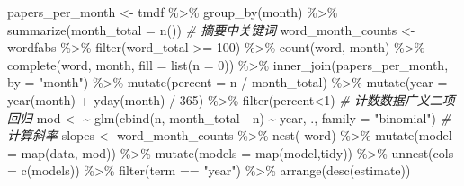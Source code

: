 \documentclass[]{tufte-book}
\newenvironment{Shaded}{}{}
\newcommand{\AttributeTok}[1]{\textcolor[rgb]{0.49,0.56,0.16}{#1}}
\newcommand{\CommentTok}[1]{\textcolor[rgb]{0.38,0.63,0.69}{\textit{#1}}}
\newcommand{\DecValTok}[1]{\textcolor[rgb]{0.25,0.63,0.44}{#1}}
\newcommand{\ErrorTok}[1]{\textcolor[rgb]{1.00,0.00,0.00}{\textbf{#1}}}
\newcommand{\FunctionTok}[1]{\textcolor[rgb]{0.02,0.16,0.49}{#1}}
\newcommand{\NormalTok}[1]{#1}
\newcommand{\OtherTok}[1]{\textcolor[rgb]{0.00,0.44,0.13}{#1}}
\newcommand{\SpecialCharTok}[1]{\textcolor[rgb]{0.25,0.44,0.63}{#1}}
\newcommand{\StringTok}[1]{\textcolor[rgb]{0.25,0.44,0.63}{#1}}
\begin{document}
\begin{Shaded}
\begin{Highlighting}[]
\NormalTok{papers\_per\_month }\OtherTok{\textless{}{-}}\NormalTok{ tmdf }\SpecialCharTok{\%\textgreater{}\%}
  \FunctionTok{group\_by}\NormalTok{(month) }\SpecialCharTok{\%\textgreater{}\%}
  \FunctionTok{summarize}\NormalTok{(}\AttributeTok{month\_total =} \FunctionTok{n}\NormalTok{())}
\CommentTok{\# 摘要中关键词}
\NormalTok{word\_month\_counts }\OtherTok{\textless{}{-}}\NormalTok{ wordfabs }\SpecialCharTok{\%\textgreater{}\%}
  \FunctionTok{filter}\NormalTok{(word\_total }\SpecialCharTok{\textgreater{}=} \DecValTok{100}\NormalTok{) }\SpecialCharTok{\%\textgreater{}\%}
  \FunctionTok{count}\NormalTok{(word, month) }\SpecialCharTok{\%\textgreater{}\%}
  \FunctionTok{complete}\NormalTok{(word, month, }\AttributeTok{fill =} \FunctionTok{list}\NormalTok{(}\AttributeTok{n =} \DecValTok{0}\NormalTok{)) }\SpecialCharTok{\%\textgreater{}\%}
  \FunctionTok{inner\_join}\NormalTok{(papers\_per\_month, }\AttributeTok{by =} \StringTok{"month"}\NormalTok{) }\SpecialCharTok{\%\textgreater{}\%}
  \FunctionTok{mutate}\NormalTok{(}\AttributeTok{percent =}\NormalTok{ n }\SpecialCharTok{/}\NormalTok{ month\_total) }\SpecialCharTok{\%\textgreater{}\%}
  \FunctionTok{mutate}\NormalTok{(}\AttributeTok{year =} \FunctionTok{year}\NormalTok{(month) }\SpecialCharTok{+} \FunctionTok{yday}\NormalTok{(month) }\SpecialCharTok{/} \DecValTok{365}\NormalTok{) }\SpecialCharTok{\%\textgreater{}\%}
        \FunctionTok{filter}\NormalTok{(percent}\SpecialCharTok{\textless{}}\DecValTok{1}\NormalTok{)}
\CommentTok{\# 计数数据广义二项回归}
\NormalTok{mod }\OtherTok{\textless{}{-}} \ErrorTok{\textasciitilde{}} \FunctionTok{glm}\NormalTok{(}\FunctionTok{cbind}\NormalTok{(n, month\_total }\SpecialCharTok{{-}}\NormalTok{ n) }\SpecialCharTok{\textasciitilde{}}\NormalTok{ year, ., }\AttributeTok{family =} \StringTok{"binomial"}\NormalTok{)}
\CommentTok{\# 计算斜率}
\NormalTok{slopes }\OtherTok{\textless{}{-}}\NormalTok{ word\_month\_counts }\SpecialCharTok{\%\textgreater{}\%}
  \FunctionTok{nest}\NormalTok{(}\SpecialCharTok{{-}}\NormalTok{word) }\SpecialCharTok{\%\textgreater{}\%}
  \FunctionTok{mutate}\NormalTok{(}\AttributeTok{model =} \FunctionTok{map}\NormalTok{(data, mod)) }\SpecialCharTok{\%\textgreater{}\%}
  \FunctionTok{mutate}\NormalTok{(}\AttributeTok{models =} \FunctionTok{map}\NormalTok{(model,tidy)) }\SpecialCharTok{\%\textgreater{}\%}
  \FunctionTok{unnest}\NormalTok{(}\AttributeTok{cols =} \FunctionTok{c}\NormalTok{(models)) }\SpecialCharTok{\%\textgreater{}\%}
  \FunctionTok{filter}\NormalTok{(term }\SpecialCharTok{==} \StringTok{"year"}\NormalTok{) }\SpecialCharTok{\%\textgreater{}\%}
  \FunctionTok{arrange}\NormalTok{(}\FunctionTok{desc}\NormalTok{(estimate))}
\end{Highlighting}
\end{Shaded}
\end{document}
